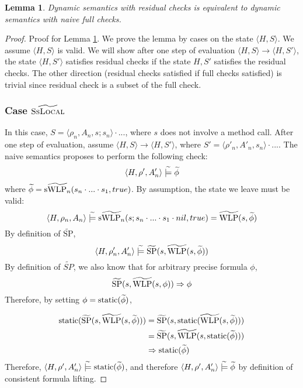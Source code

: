 \documentclass {article}
\newtheorem{lemma}[theorem]{Lemma}
\newcommand{\tphi}{\widetilde{\phi}}
\newcommand{\imp}{\Rightarrow}
\newcommand{\tconsistent}{\hspace{1mm}\widetilde{\models}\hspace{1mm}}
\newcommand{\twlp}[2]{\widetilde{\textup{WLP}}(#1,#2)}
\newcommand{\tswlpn}[2]{\widetilde{\textup{sWLP}_n}(#1,#2)}
\newcommand{\tsp}[2]{\widetilde{\textup{SP}}(#1,#2)}
\newcommand{\static}[1]{\textup{static}(#1)}
\begin{document}
\vspace*{10mm}
\begin{lemma}
\label{lemma_dynamic_residual}
Dynamic semantics with residual checks is equivalent to dynamic semantics with naive full checks.
\end{lemma}
\begin{proof} Proof for Lemma \ref{lemma_dynamic_residual}. We prove the lemma by cases on the state $\langle H,S \rangle$. We assume $\langle H,S \rangle$ is valid. We will show after one step of evaluation $\langle H, S \rangle \longrightarrow \langle H,S' \rangle$, the state $\langle H,S' \rangle$ satisfies residual checks if the state $H,S'$ satisfies the residual checks. The other direction (residual checks satisfied if full checks satisfied) is trivial since residual check is a subset of the full check.
\subsubsection*{Case $\widetilde{\textsc{SsLocal}}$}
In this case, $S = \langle \rho_n, A_n, s; s_n\rangle \cdot ...$, where $s$ does not involve a method call. After one step of evaluation, assume $\langle H, S \rangle \longrightarrow \langle H,S' \rangle$, where $S' = \langle \rho'_n, A'_n, s_n\rangle \cdot ...$. The naive semantics proposes to perform the following check: 
$$\langle H, \rho', A'_n \rangle \tconsistent \tphi$$ where $\tphi =\tswlpn{s_n \cdot ... \cdot s_1}{true}$. 
By assumption, the state we leave must be valid: $$\langle H, \rho_n, A_n \rangle \tconsistent \tswlpn{s;s_n \cdot ... \cdot s_1 \cdot nil}{ true} = \twlp{s}{\tphi}$$ By definition of $\widetilde{\text{SP}}$, $$\langle H, \rho'_n, A'_n \rangle  \tconsistent \tsp{s}{\twlp{s}{\tphi}}$$ By definition of $\widetilde{SP}$, we also know that for arbitrary precise formula $\phi$, $$\tsp{s}{\twlp{s} {\phi}} \Rightarrow \phi$$ Therefore, by setting $\phi = \static{\tphi}$,

\begin{align*}
\static{\tsp{s}{\twlp{s}{\tphi}}} &= \tsp{s}{\static{\twlp{s}{\tphi}}}\\ 
&= \tsp{s}{\twlp{s}{\static{\tphi}}} \\
&\imp \static{\tphi}
\end{align*}
Therefore, $\langle H, \rho', A'_n \rangle \tconsistent \static{\tphi}$, and therefore $\langle H, \rho', A'_n \rangle \tconsistent \tphi$ by definition of consistent formula lifting.


\end{proof}
\end{document}
